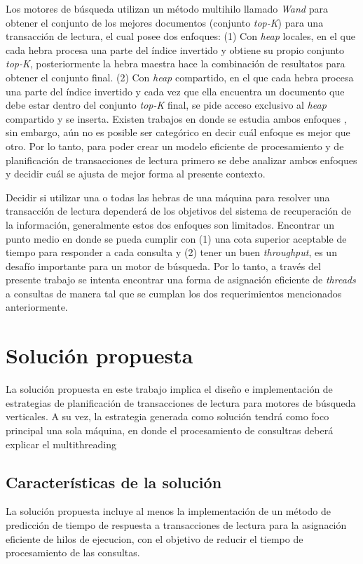 Los motores de búsqueda utilizan un método multihilo llamado \textit{Wand} para obtener el conjunto de los mejores documentos (conjunto \textit{top-K}) para una transacción de lectura, el cual posee dos enfoques: (1) Con \textit{heap} locales, en el que cada hebra procesa una parte del índice invertido y obtiene su propio conjunto \textit{top-K}, posteriormente la hebra maestra hace la combinación de resultatos para obtener el conjunto final. (2) Con \textit{heap} compartido, en el que cada hebra procesa una parte del índice invertido y cada vez que ella encuentra un documento que debe estar dentro del conjunto \textit{top-K} final, se pide acceso exclusivo al \textit{heap} compartido y se inserta. Existen trabajos en donde se estudia ambos enfoques \citep{Rojas:2013}, sin embargo, aún no es posible ser categórico en decir cuál enfoque es mejor que otro. Por lo tanto, para poder crear un modelo eficiente de procesamiento y de planificación de transacciones de lectura primero se debe analizar ambos enfoques y decidir cuál se ajusta de mejor forma al presente contexto.

Decidir si utilizar una o todas las hebras de una máquina para resolver una transacción de lectura dependerá de los objetivos del sistema de recuperación de la información, generalmente estos dos enfoques son limitados. Encontrar un punto medio en donde se pueda cumplir con (1) una cota superior aceptable de tiempo para responder a cada consulta y (2) tener un buen \textit{throughput}, es un desafío importante para un motor de búsqueda. Por lo tanto, a través del presente trabajo se intenta encontrar una forma de asignación eficiente de \textit{threads} a consultas de manera tal que se cumplan los dos requerimientos mencionados anteriormente. 


\section{Solución propuesta}
\label{intro:solucionpropuesta}
La solución propuesta en este trabajo implica el diseño e implementación de estrategias de planificación de transacciones de lectura para motores de búsqueda verticales. A su vez, la estrategia generada como solución tendrá como foco principal una sola máquina, en donde el procesamiento de consultras deberá explicar el multithreading 


\subsection{Caracter\'isticas de la solución}
\label{intro:caracteristicassolucion}
La solución propuesta incluye al menos la implementación de un método de predicción de tiempo de respuesta a transacciones de lectura para la asignación eficiente de hilos de ejecucion, con el objetivo de reducir el tiempo de procesamiento de las consultas. 

